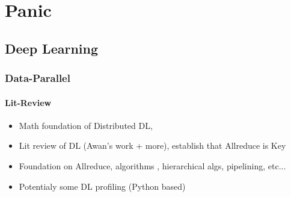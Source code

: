 
\glsresetall %
\chapter[Panic]{Panic}\label{ch:Panic}

\section{Deep Learning}
\subsection{Data-Parallel}
\subsubsection{Lit-Review}

\begin{itemize}
    \item Math foundation of Distributed DL, \cite{Ben-Nun2019DemystifyDL}
    \item Lit review of DL (Awan's work + more), establish that Allreduce is Key
    \item Foundation on Allreduce, algorithms \cite{Thakur2005OptMPICH}, hierarchical algs, pipelining, etc... 
    \item Potentialy some DL profiling (Python based)
\end{itemize}



\clearpage